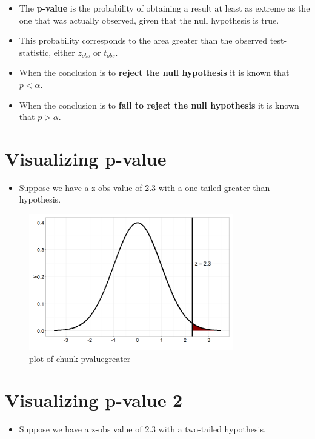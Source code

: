 \documentclass[12pt]{article}
\begin{document}
\begin{itemize}
\itemsep1pt\parskip0pt
\item
  The \textbf{p-value} is the probability of obtaining a result at least
  as extreme as the one that was actually observed, given that the null
  hypothesis is true.
\item
  This probability corresponds to the area greater than the observed
  test-statistic, either \(z_{obs}\) or \(t_{obs}\).
\item
  When the conclusion is to \textbf{reject the null hypothesis} it is
  known that \(p < \alpha\).
\item
  When the conclusion is to \textbf{fail to reject the null hypothesis}
  it is known that \(p > \alpha\).
\end{itemize}

\section{Visualizing p-value}\label{visualizing-p-value}

\begin{itemize}
\itemsep1pt\parskip0pt
\item
  Suppose we have a z-obs value of 2.3 with a one-tailed greater than
  hypothesis.
\end{itemize}

\begin{figure}[H]
\centering
\includegraphics[width=3.5in]{figure/pvaluegreater-1.png}
\caption{plot of chunk pvaluegreater}
\end{figure}

\section{Visualizing p-value 2}\label{visualizing-p-value-2}

\begin{itemize}
\itemsep1pt\parskip0pt
\item
  Suppose we have a z-obs value of 2.3 with a two-tailed hypothesis.
\end{itemize}
\end{document}
